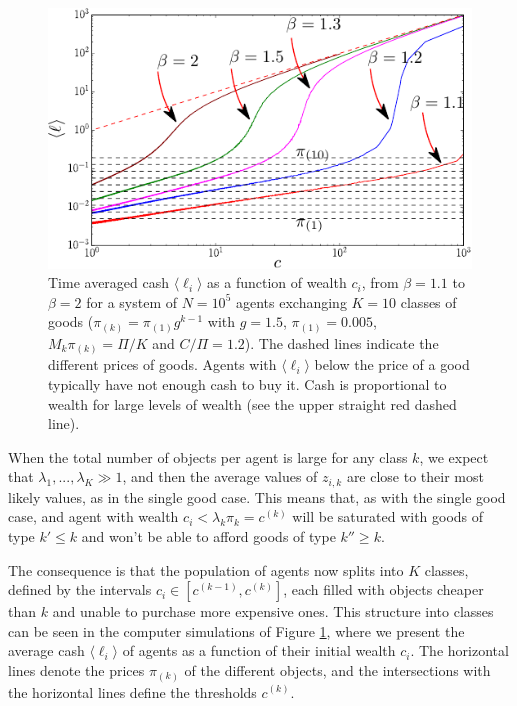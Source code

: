 \begin{figure}
\includegraphics[width=\textwidth]{figs_ineq/cropping-liquidity_global-crop.pdf}
\caption{Time averaged cash $\langle \ell_i \rangle$ as a function of wealth $c_i$, from $\beta= 1.1$ to $\beta =2$  for a system of $N=10^5$ agents exchanging $K=10$ classes of goods ($\pi_{(k)}=\pi_{(1)}g^{k-1}$ with $g=1.5$, $\pi_{(1)}=0.005$, $M_k\pi_{(k)}=\Pi/K$ and $C/\Pi=1.2$). The dashed lines indicate the different prices of goods. Agents with $\langle \ell_i \rangle$ below the price of a good typically have not enough cash to buy it. Cash is proportional to wealth for large levels of wealth (see the upper straight red dashed line).}
\label{Fig:K10_classes}
\end{figure}


When the total number of objects per agent is large for any class $k$, we expect that $\lambda_1, ..., \lambda_K \gg 1$, and then the average values of $z_{i,k}$ are close to their most likely values, as in the single good case. This means that, as with the single good case, and agent with wealth $c_i < \lambda_k \pi_k = c^{(k)}$ will be saturated with goods of type $k'\leq k$ and won't be able to afford goods of type $k'' \geq k$. 

The consequence is that the population of agents now splits into $K$ classes, defined by the intervals $c_i \in [c^{(k-1)},c^{(k)}]$, each filled with objects cheaper than $k$ and unable to purchase more expensive ones. This structure into classes can be seen in the computer simulations of Figure \ref{Fig:K10_classes}, where we present the average cash $\langle \ell_i \rangle$ of agents as a function of their initial wealth $c_i$. The horizontal lines denote the prices $\pi_{(k)}$ of the different objects, and the intersections with the horizontal lines define the thresholds $c^{(k)}$.


